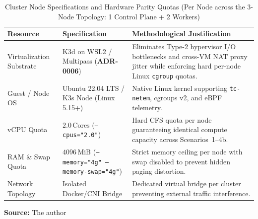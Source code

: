 \begin{table}[htbp]
\centering
\caption{Cluster Node Specifications and Hardware Parity Quotas (Per Node across the 3-Node Topology: 1 Control Plane + 2 Workers)}
\label{tab:vm-specs}
\small
\renewcommand{\arraystretch}{1.1}
\begin{tabularx}{\textwidth}{|l|l|X|}
\hline
\textbf{Resource} & \textbf{Specification} & \textbf{Methodological Justification} \\ \hline
Virtualization Substrate & K3d on WSL2 / Multipass (\textbf{ADR-0006}) & Eliminates Type-2 hypervisor I/O bottlenecks and cross-VM NAT proxy jitter while enforcing hard per-node Linux \texttt{cgroup} quotas. \\ \hline
Guest / Node OS & Ubuntu 22.04 LTS / K3s Node (Linux 5.15+) & Native Linux kernel supporting \texttt{tc-netem}, cgroups v2, and eBPF telemetry. \\ \hline
vCPU Quota & $2.0\,\text{Cores}$ (\texttt{--cpus="2.0"}) & Hard CFS quota per node guaranteeing identical compute capacity across Scenarios~1--4b. \\ \hline
RAM \& Swap Quota & $4096\,\text{MiB}$ (\texttt{--memory="4g" --memory-swap="4g"}) & Strict memory ceiling per node with swap disabled to prevent hidden paging distortion. \\ \hline
Network Topology & Isolated Docker/CNI Bridge & Dedicated virtual bridge per cluster preventing external traffic interference. \\ \hline
\end{tabularx}
\par\medskip\ABNTEXfontereduzida\selectfont\textbf{Source:} The author \par\medskip
\end{table}
